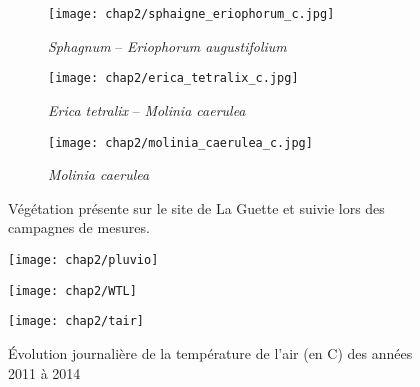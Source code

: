 \begin{figure}[htbp]
    \centering
    \begin{subfigure}[b]{.98\textwidth} %
        \centering \texttt{[image: chap2/sphaigne\_eriophorum\_c.jpg]}
        \caption{\textit{Sphagnum} -- \textit{Eriophorum augustifolium}}\label{fig:sphg_erio}
    \end{subfigure}
    
    \begin{subfigure}[b]{0.49\textwidth}
        \centering \texttt{[image: chap2/erica\_tetralix\_c.jpg]}
        \caption{\textit{Erica tetralix} -- \textit{Molinia caerulea}}\label{fig:erica}
    \end{subfigure}
    \begin{subfigure}[b]{0.49\textwidth}
        \centering \texttt{[image: chap2/molinia\_caerulea\_c.jpg]}
        \caption{\textit{Molinia caerulea}}\label{fig:mol}
    \end{subfigure}

    \caption{Végétation présente sur le site de La Guette et suivie lors des campagnes de mesures.}\label{fig:veg}
\end{figure}

\begin{figure}
\centering
\texttt{[image: chap2/pluvio]}\\
\caption{Évolution horaire de la pluviométrie, en \si{\mm}, des années 2011 à 2014}
\label{fig:pluvio}
\texttt{[image: chap2/WTL]}\\
\caption{Évolution du niveau de la nappe, en cm par rapport à la surface, des années 2011 à 2014}
\label{fig:WTL}
\texttt{[image: chap2/tair]}
\caption{Évolution journalière de la température de l'air (en \textdegree C) des années 2011 à 2014}
\label{fig:tair}
\end{figure}

